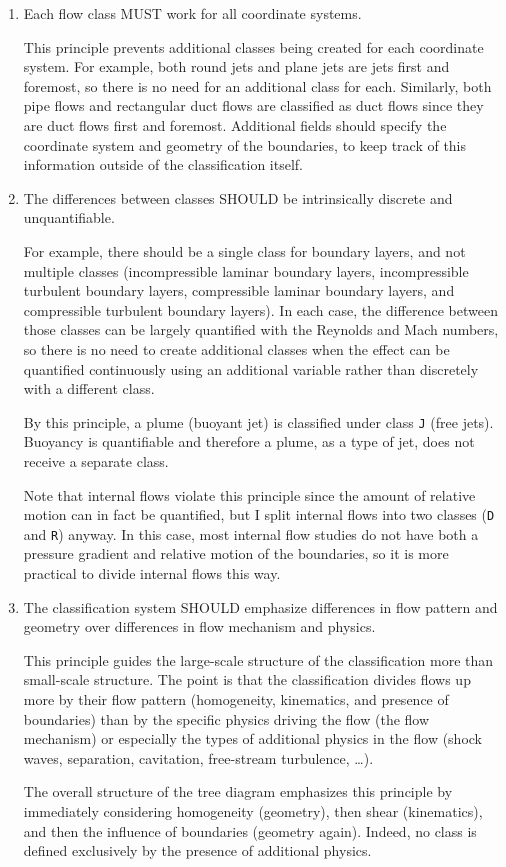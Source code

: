 \begin{enumerate}
\item
Each flow class MUST work for all coordinate systems.

This principle prevents additional classes being created for each coordinate
system.  For example, both round jets and plane jets are jets first and
foremost, so there is no need for an additional class for each.  Similarly,
both pipe flows and rectangular duct flows are classified as duct flows since
they are duct flows first and foremost.  Additional fields should specify the
coordinate system and geometry of the boundaries, to keep track of this
information outside of the classification itself.


\item
The differences between classes SHOULD be intrinsically discrete and
unquantifiable.

For example, there should be a single class for boundary layers, and not
multiple classes (incompressible laminar boundary layers, incompressible
turbulent boundary layers, compressible laminar boundary layers, and
compressible turbulent boundary layers).  In each case, the difference between
those classes can be largely quantified with the Reynolds and Mach numbers, so
there is no need to create additional classes when the effect can be quantified
continuously using an additional variable rather than discretely with a
different class.

By this principle, a plume (buoyant jet) is classified under class \texttt{J}
(free jets).  Buoyancy is quantifiable and therefore a plume, as a type of jet,
does not receive a separate class.

Note that internal flows violate this principle since the amount of relative
motion can in fact be quantified, but I split internal flows into two classes
(\texttt{D} and \texttt{R}) anyway.  In this case, most internal flow studies
do not have both a pressure gradient and relative motion of the boundaries, so
it is more practical to divide internal flows this way.


\item
The classification system SHOULD emphasize differences in flow pattern and
geometry over differences in flow mechanism and physics.

This principle guides the large-scale structure of the classification more than
small-scale structure.  The point is that the classification divides flows up
more by their flow pattern (homogeneity, kinematics, and presence of
boundaries) than by the specific physics driving the flow (the flow mechanism)
or especially the types of additional physics in the flow (shock waves,
separation, cavitation, free-stream turbulence, \ldots).

The overall structure of the tree diagram emphasizes this principle by
immediately considering homogeneity (geometry), then shear (kinematics), and
then the influence of boundaries (geometry again).  Indeed, no class is defined
exclusively by the presence of additional physics.


\end{enumerate}
